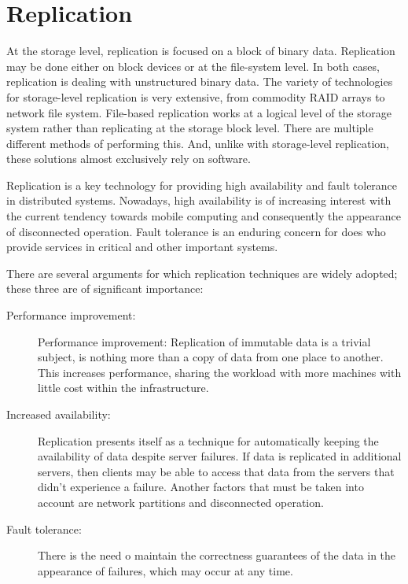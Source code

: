 \section{Replication}
\label{sec:res_replication}


At the storage level, replication is focused on a block of binary data. Replication may be done either on block devices or at the file-system level. In both cases, replication is dealing with unstructured binary data. The variety of technologies for storage-level replication is very extensive, from commodity RAID arrays to network file system.
File-based replication works at a logical level of the storage system rather than replicating at the storage block level. There are multiple different methods of performing this. And, unlike with storage-level replication, these solutions almost exclusively rely on software.

Replication is a key technology for providing high availability and fault tolerance in distributed systems. Nowadays, high availability is of increasing interest with the current tendency towards mobile computing and consequently the appearance of disconnected operation. Fault tolerance is an enduring concern for does who provide services in critical and other important systems.

There are several arguments for which replication techniques are widely adopted; these three are of significant importance:

\begin{description}
	\item [Performance improvement:] Performance improvement: Replication of immutable data is a trivial subject, is nothing more than a copy of data from one place to another. This increases performance, sharing the workload with more machines with little cost within the infrastructure.
	\item [Increased availability:] Replication presents itself as a technique for automatically keeping the availability of data despite server failures. If data is replicated in additional servers, then clients may be able to access that data from the servers that didn't experience a failure.
		Another factors that must be taken into account are network partitions and disconnected operation.
	\item [Fault tolerance:] There is the need o maintain the correctness guarantees of the data in the appearance of failures, which may occur at any time.
\end{description}





 
